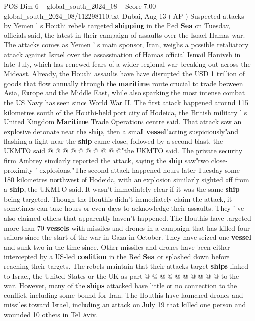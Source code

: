 \begin{textsample}{POS Dim 6 – global\_south\_2024\_08 – Score 7.00 – global\_south\_2024\_08/112298110.txt}  \label{ex:f6_pos_326}
Dubai, Aug 13 ( AP ) Suspected attacks by Yemen ' s Houthi rebels targeted \textbf{shipping} in the Red \textbf{Sea} on Tuesday, officials said, the latest in their campaign of assaults over the Israel-Hamas war.
The attacks comes as Yemen ' s main sponsor, Iran, weighs a possible retaliatory attack against Israel over the assassination of Hamas official Ismail Haniyeh in late July, which has renewed fears of a wider regional war breaking out across the Mideast.
Already, the Houthi assaults have have disrupted the USD 1 trillion of goods that flow annually through the \textbf{maritime} route crucial to trade between Asia, Europe and the Middle East, while also sparking the most intense combat the US Navy has seen since World War II.
The first attack happened around 115 kilometres south of the Houthi-held port city of Hodeida, the British military ' s United Kingdom \textbf{Maritime} Trade Operations centre said.
That attack saw an explosive detonate near the \textbf{ship}, then a small \textbf{vessel}"acting suspiciously"and flashing a light near the \textbf{ship} came close, followed by a second blast, the UKMTO said @ @ @ @ @ @ @ @ @ @"the UKMTO said.
The private security firm Ambrey similarly reported the attack, saying the \textbf{ship} saw"two close-proximity ' explosions."The second attack happened hours later Tuesday some 180 kilometres northwest of Hodeida, with an explosion similarly sighted off from a \textbf{ship}, the UKMTO said.
It wasn't immediately clear if it was the same \textbf{ship} being targeted.
Though the Houthis didn't immediately claim the attack, it sometimes can take hours or even days to acknowledge their assaults.
They ' ve also claimed others that apparently haven't happened.
The Houthis have targeted more than 70 \textbf{vessels} with missiles and drones in a campaign that has killed four sailors since the start of the war in Gaza in October.
They have seized one \textbf{vessel} and sunk two in the time since.
Other missiles and drones have been either intercepted by a US-led \textbf{coalition} in the Red \textbf{Sea} or splashed down before reaching their targets.
The rebels maintain that their attacks target \textbf{ships} linked to Israel, the United States or the UK as part @ @ @ @ @ @ @ @ @ @ to the war.
However, many of the \textbf{ships} attacked have little or no connection to the conflict, including some bound for Iran.
The Houthis have launched drones and missiles toward Israel, including an attack on July 19 that killed one person and wounded 10 others in Tel Aviv.

\end{textsample}
